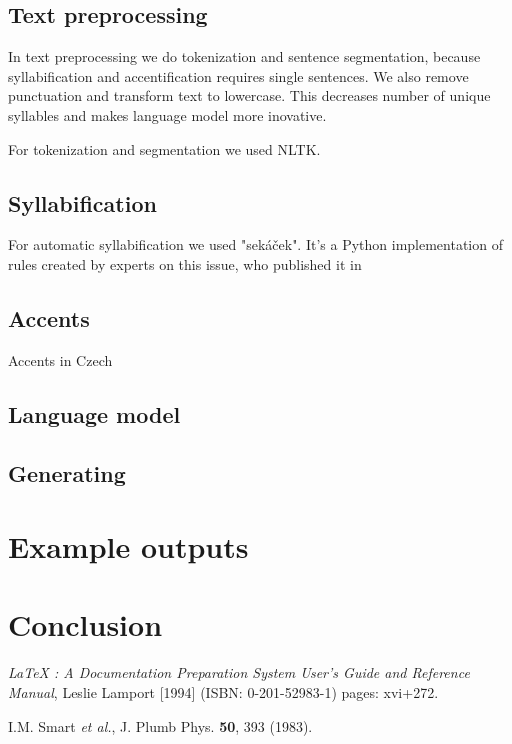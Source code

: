 \documentclass[a4]{article}
\begin{document}
\subsection{Text preprocessing}

In text preprocessing we do tokenization and sentence segmentation, because
syllabification and accentification requires single sentences. We also
remove punctuation and transform text to lowercase. This decreases number of
unique syllables and makes language model more inovative.

For tokenization and segmentation we used NLTK. %

\subsection{Syllabification}

For automatic syllabification we used "sekáček". %
It's a Python implementation of rules created by experts on this issue, who
published it in %

\subsection{Accents}

Accents in Czech 

\subsection{Language model}

\subsection{Generating}

\section{Example outputs}

\section{Conclusion}


\begin{thebibliography}{99}

 {\sl LaTeX : A Documentation Preparation System User's Guide and Reference Manual}, Leslie Lamport [1994] (ISBN: 0-201-52983-1) pages: xvi+272.

I.M. Smart {\it et al.}, J. Plumb Phys. {\bf 50}, 393 (1983).

\end{thebibliography}



\end{document}
